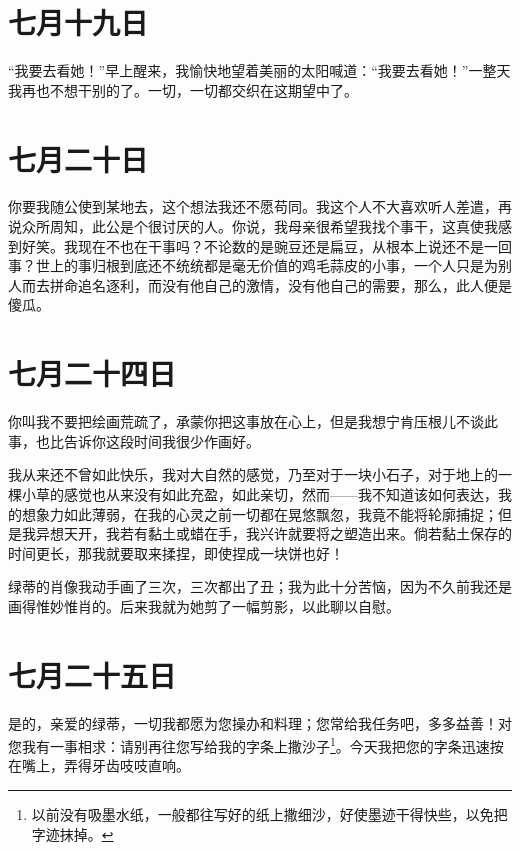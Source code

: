 \documentclass[12pt,oneside]{book}
\begin{document}
\chapter{七月十九日}
\label{sec-2-23}
“我要去看她！”早上醒来，我愉快地望着美丽的太阳喊道：“我要去看她！”一整天我再也不想干别的了。一切，一切都交织在这期望中了。
　　
\chapter{七月二十日}
\label{sec-2-24}
你要我随公使到某地去，这个想法我还不愿苟同。我这个人不大喜欢听人差遣，再说众所周知，此公是个很讨厌的人。你说，我母亲很希望我找个事干，这真使我感到好笑。我现在不也在干事吗？不论数的是豌豆还是扁豆，从根本上说还不是一回事？世上的事归根到底还不统统都是毫无价值的鸡毛蒜皮的小事，一个人只是为别人而去拼命追名逐利，而没有他自己的激情，没有他自己的需要，那么，此人便是傻瓜。
　　

\chapter{七月二十四日}
\label{sec-2-25}
你叫我不要把绘画荒疏了，承蒙你把这事放在心上，但是我想宁肯压根儿不谈此事，也比告诉你这段时间我很少作画好。

我从来还不曾如此快乐，我对大自然的感觉，乃至对于一块小石子，对于地上的一棵小草的感觉也从来没有如此充盈，如此亲切，然而——我不知道该如何表达，我的想象力如此薄弱，在我的心灵之前一切都在晃悠飘忽，我竟不能将轮廓捕捉；但是我异想天开，我若有黏土或蜡在手，我兴许就要将之塑造出来。倘若黏土保存的时间更长，那我就要取来揉捏，即使捏成一块饼也好！

绿蒂的肖像我动手画了三次，三次都出了丑；我为此十分苦恼，因为不久前我还是画得惟妙惟肖的。后来我就为她剪了一幅剪影，以此聊以自慰。
　　

\chapter{七月二十五日}
\label{sec-2-26}
是的，亲爱的绿蒂，一切我都愿为您操办和料理；您常给我任务吧，多多益善！对您我有一事相求：请别再往您写给我的字条上撒沙子\footnote{以前没有吸墨水纸，一般都往写好的纸上撒细沙，好使墨迹干得快些，以免把字迹抹掉。}。今天我把您的字条迅速按在嘴上，弄得牙齿吱吱直响。
　　
\end{document}
